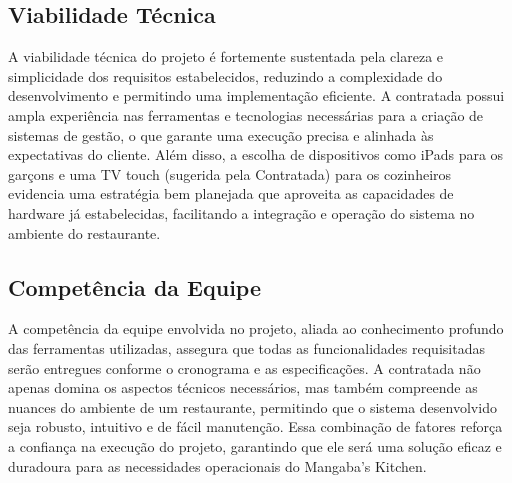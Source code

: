 \subsection {Viabilidade Técnica}
A viabilidade técnica do projeto é fortemente sustentada pela clareza e simplicidade dos requisitos estabelecidos, reduzindo a complexidade do desenvolvimento e permitindo uma implementação eficiente. A contratada possui ampla experiência nas ferramentas e tecnologias necessárias para a criação de sistemas de gestão, o que garante uma execução precisa e alinhada às expectativas do cliente. Além disso, a escolha de dispositivos como iPads para os garçons e uma TV touch (sugerida pela Contratada) para os cozinheiros evidencia uma estratégia bem planejada que aproveita as capacidades de hardware já estabelecidas, facilitando a integração e operação do sistema no ambiente do restaurante.
\subsection {Competência da Equipe}
A competência da equipe envolvida no projeto, aliada ao conhecimento profundo das ferramentas utilizadas, assegura que todas as funcionalidades requisitadas serão entregues conforme o cronograma e as especificações. A contratada não apenas domina os aspectos técnicos necessários, mas também compreende as nuances do ambiente de um restaurante, permitindo que o sistema desenvolvido seja robusto, intuitivo e de fácil manutenção. Essa combinação de fatores reforça a confiança na execução do projeto, garantindo que ele será uma solução eficaz e duradoura para as necessidades operacionais do Mangaba's Kitchen.